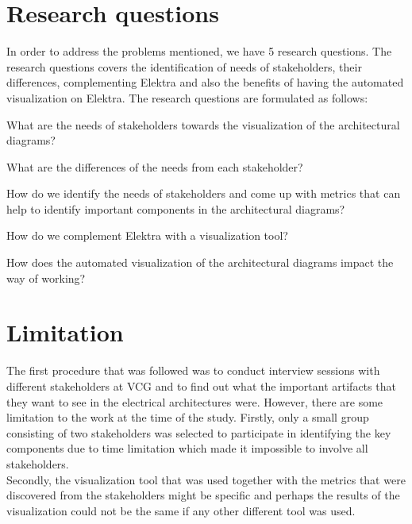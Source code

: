 \section{Research questions} \label{RQ_ref}
In order to address the problems mentioned, we have 5 research questions. The research questions covers the identification of needs of stakeholders, their differences, complementing Elektra and also the benefits of having the automated visualization on Elektra. The research questions are formulated as follows:

\begin{que} \label{que:1}
What are the needs of stakeholders towards the visualization of the architectural diagrams?
\end{que}

\begin{que} \label{que:2}
What are the differences of the needs from each stakeholder?
\end{que}

\begin{que} \label{que:3}
How do we identify the needs of stakeholders and come up with metrics that can help to identify important components in the architectural diagrams?
\end{que}

\begin{que}\label{que:4}
How do we complement Elektra with a visualization tool?
\end{que}

\begin{que} \label{que:5}
How does the automated visualization of the architectural diagrams impact the way of working?
\end{que}


\section{Limitation} \label{Limitation_ref}
The first procedure that was followed was to conduct interview sessions with different stakeholders at VCG and to find out what the important artifacts that they want to see in the electrical architectures were. However, there are some limitation to the work at the time of the study. Firstly, only a small group consisting of two stakeholders was selected to participate in identifying the key components due to time limitation which made it impossible to involve all stakeholders. \\

Secondly, the visualization tool that was used together with the metrics that were discovered from the stakeholders might be specific and perhaps the results of the visualization could not be the same if any other different tool was used. \\

